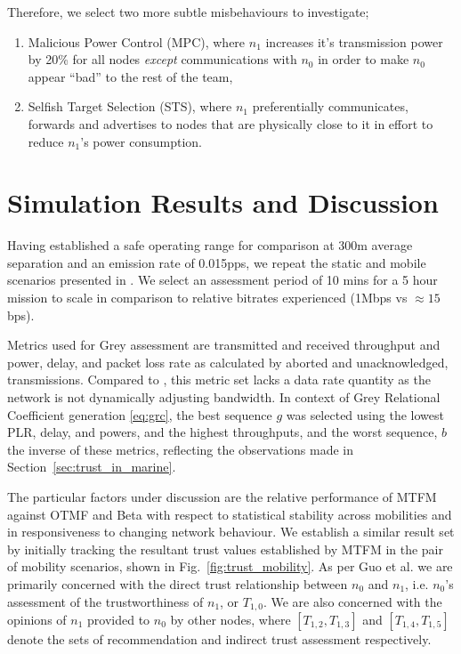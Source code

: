 \documentclass[conference]{IEEEtran}
\begin{document}
Therefore, we select two more subtle misbehaviours to investigate; 
\begin{enumerate}
  \item Malicious Power Control (MPC), where $n_1$ increases it's transmission power by 20\% for all nodes \emph{except} communications with $n_0$ in order to make $n_0$ appear ``bad'' to the rest of the team,
  \item Selfish Target Selection (STS), where $n_1$ preferentially communicates, forwards and advertises to nodes that are physically close to it in effort to reduce $n_1$'s power consumption.
\end{enumerate}


\section{Simulation Results and Discussion}\label{sec:trustresultsanddiscussion}

Having established a safe operating range for comparison at 300m average separation and an emission rate of 0.015pps, we repeat the static and mobile scenarios presented in \cite{Guo11}. 
We select an assessment period of 10 mins for a 5 hour mission to scale in comparison to relative bitrates experienced (1Mbps vs $\approx15$bps).

Metrics used for Grey assessment are transmitted and received throughput and power, delay, and packet loss rate as calculated by aborted and unacknowledged, transmissions.
Compared to \cite{Guo11}, this metric set lacks a data rate quantity as the network is not dynamically adjusting bandwidth.
In context of Grey Relational Coefficient generation \eqref{eq:grc}, the best sequence $g$ was selected using the lowest PLR, delay, and powers, and the highest throughputs, and the worst sequence, $b$ the inverse of these metrics, reflecting the observations made in Section~\ref{sec:trust_in_marine}.

The particular factors under discussion are the relative performance of MTFM against OTMF and Beta with respect to statistical stability across mobilities and in responsiveness to changing network behaviour. 
We establish a similar result set by initially tracking the resultant trust values established by MTFM in the pair of mobility scenarios, shown in Fig.~\ref{fig:trust_mobility}.
As per Guo et al. we are primarily concerned with the direct trust relationship between $n_0$ and $n_1$, i.e. $n_0$'s assessment of the trustworthiness of $n_1$, or $T_{1,0}$.
We are also concerned with the opinions of $n_1$ provided to $n_0$ by other nodes, where $[T_{1,2},T_{1,3}]$ and $[T_{1,4},T_{1,5}]$ denote the sets of recommendation and indirect trust assessment respectively.
\end{document}
